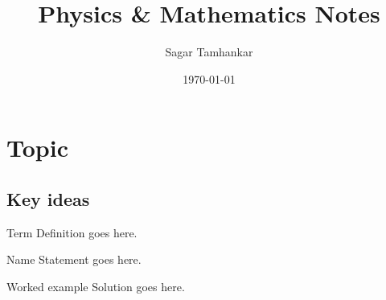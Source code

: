 \documentclass[teacher]{sagar-notes}
\title{Physics \& Mathematics Notes}
\author{Sagar Tamhankar}
\date{\today}
\begin{document}
\maketitle
\tableofcontents

\section{Topic}
\subsection{Key ideas}
\begin{definition}{Term}
Definition goes here.
\end{definition}

\begin{theorem}{Name}
Statement goes here.
\end{theorem}

\begin{example}{Worked example}
Solution goes here.
\end{example}

\end{document}
